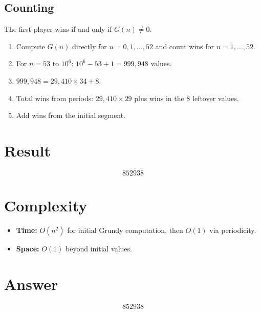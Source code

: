 \documentclass[12pt]{article}
\begin{document}
\subsection{Counting}
The first player wins if and only if $G(n) \neq 0$.

\begin{enumerate}
    \item Compute $G(n)$ directly for $n = 0, 1, \ldots, 52$ and count wins for $n = 1, \ldots, 52$.
    \item For $n = 53$ to $10^6$: $10^6 - 53 + 1 = 999{,}948$ values.
    \item $999{,}948 = 29{,}410 \times 34 + 8$.
    \item Total wins from periods: $29{,}410 \times 29$ plus wins in the 8 leftover values.
    \item Add wins from the initial segment.
\end{enumerate}

\section{Result}
\[
    \boxed{852938}
\]

\section{Complexity}
\begin{itemize}
    \item \textbf{Time:} $O(n^2)$ for initial Grundy computation, then $O(1)$ via periodicity.
    \item \textbf{Space:} $O(1)$ beyond initial values.
\end{itemize}

\section{Answer}

\[
\boxed{852938}
\]
\end{document}
